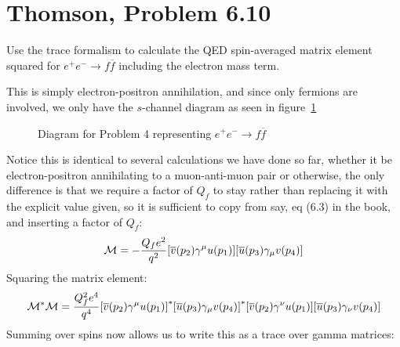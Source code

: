 \documentclass[12pt]{article}
\renewcommand{\bar}{\overline}
\newcommand{\M}{\mathcal{M}}
\begin{document}
\section{Thomson, Problem 6.10}
\begin{problem}
  Use the trace formalism to calculate the QED spin-averaged matrix element squared for $e^+e^-\to f\bar{f}$ including the electron mass term.
\end{problem}
This is simply electron-positron annihilation, and since only fermions are involved, we only have the $s$-channel diagram as seen in figure~\ref{fig:p4}
\begin{figure}[H]
  \centering
  \caption{Diagram for Problem 4 representing $e^+e^-\to f\bar{f}$}\label{fig:p4}
\end{figure}
Notice this is identical to several calculations we have done so far, whether it be electron-positron annihilating to a muon-anti-muon pair or otherwise, the only difference is that we require a factor of $Q_f$ to stay rather than replacing it with the explicit value given, so it is sufficient to copy from say, eq (6.3) in the book, and inserting a factor of $Q_f$:
\begin{align*}
  \M=-\frac{Q_f e^2}{q^2}\qty[\bar{v}(p_2)\gamma^\mu u(p_1)]
  \qty[\bar{u}(p_3)\gamma_\mu v(p_4)]
\end{align*}
Squaring the matrix element:
\begin{align*}
  \M^*\M=\frac{Q_f^2e^4}{q^4}
  {\qty[\bar{v}(p_2)\gamma^\mu u(p_1)]}^*
  {\qty[\bar{u}(p_3)\gamma_\mu v(p_4)]}^*
  \qty[\bar{v}(p_2)\gamma^\nu u(p_1)]
  \qty[\bar{u}(p_3)\gamma_\nu v(p_4)]
\end{align*}
Summing over spins now allows us to write this as a trace over gamma matrices:
\end{document}
